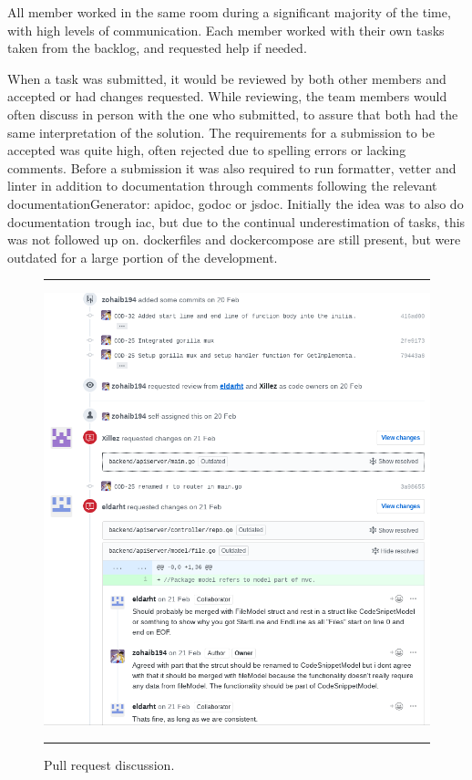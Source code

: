 All member worked in the same room during a significant majority of the time, with high levels of communication. Each member worked with their own tasks taken from the backlog, and requested help if needed. 

When a task was submitted, it would be reviewed by both other members and accepted or had changes requested. While reviewing, the team members would often discuss in person with the one who submitted, to assure that both had the same interpretation of the solution. The requirements for a submission to be accepted was quite high, often rejected due to spelling errors or lacking comments. Before a submission it was also required to run \gls{formatter}, \gls{vetter} and \gls{linter} in addition to documentation through comments following the relevant \gls{documentationGenerator}: \gls{apidoc}, \gls{godoc} or \gls{jsdoc}. Initially the idea was to also do documentation trough \gls{iac}, but due to the continual underestimation of tasks, this was not followed up on. \glspl{dockerfile} and \gls{dockercompose} are still present, but were outdated for a large portion of the development.

\begin{figure}[H]
    \noindent\rule{\textwidth}{1pt}    
    \includegraphics[width=\textwidth]{inc/images/pullrequestDiscussion.png}
    \noindent\rule{\textwidth}{1pt}
    \caption{Pull request discussion.}
    \label{fig:pullrequestDiscussion}
\end{figure}


